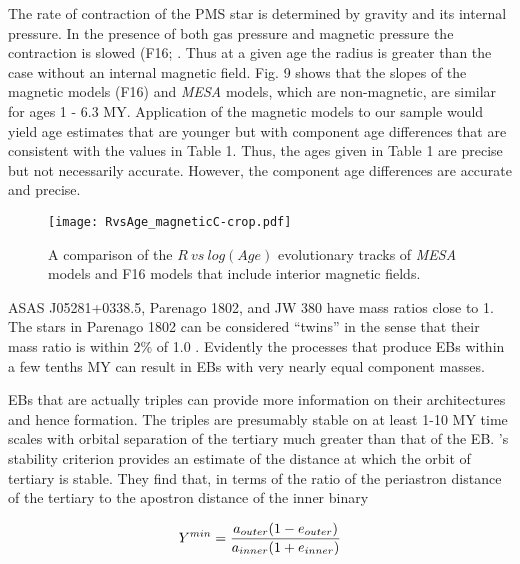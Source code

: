 \documentclass[12pt,preprint]{aastex6}
\begin{document}
 


The rate of contraction of the PMS star is determined by
gravity and its internal pressure.  In the presence
of both gas pressure and magnetic pressure the contraction
is slowed (F16; \citet{2017ApJ...834...67M}.
Thus at a given age the radius is greater than
the case without an internal magnetic field.
Fig. 9  shows that the slopes of the magnetic models (F16) 
and {\it MESA} models, which are non-magnetic, are similar
for ages 1 - 6.3 MY.  Application of the magnetic 
models to our sample would yield age estimates that are
younger but with component age differences that are
consistent with the values in Table 1. Thus, the ages 
given in Table 1 are precise but not necessarily accurate.
However, the component age differences are accurate and precise.

\begin{figure}
\centering
{}
\texttt{[image: RvsAge\_magneticC-crop.pdf]}
\caption{A comparison of the $R~vs~log(Age)$ 
evolutionary tracks of {\it MESA} models and  F16 models that 
include interior magnetic fields. }
\end{figure}

 ASAS J05281+0338.5, Parenago 1802, and JW 380 have 
mass ratios close to 1.  The stars in Parenago 1802 can be 
considered ``twins'' in the sense that their mass ratio 
is  within $2\%$ of 1.0 \citep{2009AJ....137.3442S}. Evidently
the processes that produce EBs within a few tenths MY
can result in EBs with  very nearly equal component masses.

EBs that are actually triples can provide
more information on their architectures and hence formation.
The triples are presumably stable on at least 1-10 MY
time scales with orbital separation of the tertiary 
much greater than that of  the EB.  \citet{1995ApJ...455..640E}'s
stability criterion provides an estimate of the 
distance at which the orbit of tertiary is stable.  They 
find that, in terms of the ratio of the periastron 
distance of the tertiary to the apostron distance of 
the inner binary  

$$ Y^{min} = {{a_{outer}(1-e_{outer})}\over{a_{inner}(1+e_{inner})}}  $$
\end{document}
